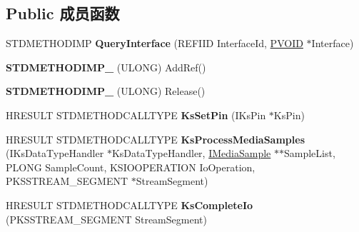\subsection*{Public 成员函数}
\begin{DoxyCompactItemize}
\item 
\mbox{\label{class_c_ks_interface_handler_a85ac44b82459b0bc89080519e7022e40}} 
S\+T\+D\+M\+E\+T\+H\+O\+D\+I\+MP {\bfseries Query\+Interface} (R\+E\+F\+I\+ID Interface\+Id, \hyperlink{interfacevoid}{P\+V\+O\+ID} $\ast$Interface)
\item 
\mbox{\label{class_c_ks_interface_handler_ab09f1f0339a4f2a7cbaddac6ddcdbd2a}} 
{\bfseries S\+T\+D\+M\+E\+T\+H\+O\+D\+I\+M\+P\+\_\+} (U\+L\+O\+NG) Add\+Ref()
\item 
\mbox{\label{class_c_ks_interface_handler_a60c80382f8faf408165caecfa6a2dfe4}} 
{\bfseries S\+T\+D\+M\+E\+T\+H\+O\+D\+I\+M\+P\+\_\+} (U\+L\+O\+NG) Release()
\item 
\mbox{\label{class_c_ks_interface_handler_abeeee6b6e9a8158781c093c6605ca54c}} 
H\+R\+E\+S\+U\+LT S\+T\+D\+M\+E\+T\+H\+O\+D\+C\+A\+L\+L\+T\+Y\+PE {\bfseries Ks\+Set\+Pin} (I\+Ks\+Pin $\ast$Ks\+Pin)
\item 
\mbox{\label{class_c_ks_interface_handler_a57adef44f7d01e5f70d8dffaf6bf3e54}} 
H\+R\+E\+S\+U\+LT S\+T\+D\+M\+E\+T\+H\+O\+D\+C\+A\+L\+L\+T\+Y\+PE {\bfseries Ks\+Process\+Media\+Samples} (I\+Ks\+Data\+Type\+Handler $\ast$Ks\+Data\+Type\+Handler, \hyperlink{interface_i_media_sample}{I\+Media\+Sample} $\ast$$\ast$Sample\+List, P\+L\+O\+NG Sample\+Count, K\+S\+I\+O\+O\+P\+E\+R\+A\+T\+I\+ON Io\+Operation, P\+K\+S\+S\+T\+R\+E\+A\+M\+\_\+\+S\+E\+G\+M\+E\+NT $\ast$Stream\+Segment)
\item 
\mbox{\label{class_c_ks_interface_handler_a1fa935a6da631f8ded61fc0b9979db10}} 
H\+R\+E\+S\+U\+LT S\+T\+D\+M\+E\+T\+H\+O\+D\+C\+A\+L\+L\+T\+Y\+PE {\bfseries Ks\+Complete\+Io} (P\+K\+S\+S\+T\+R\+E\+A\+M\+\_\+\+S\+E\+G\+M\+E\+NT Stream\+Segment)
\end{DoxyCompactItemize}

